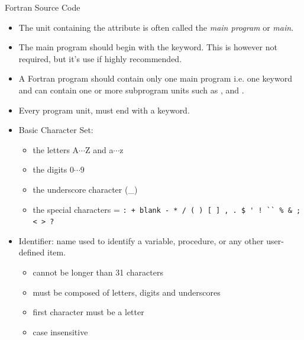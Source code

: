 \documentclass[10pt,t]{beamer}
\begin{document}
\begin{frame}{Fortran Source Code}
\begin{itemize}
      \begin{itemize}
        \item {}
        \item {}
        \item {}
        \item {}
      \end{itemize}
    \item The unit containing the  attribute is often called the {\em main program} or {\em main}.
    \item The main program should begin with the  keyword. This is however not required, but it's use if highly recommended.
    \item A Fortran program should contain only one main program i.e. one  keyword and can contain one or more subprogram units such as ,  and .
    \item Every program unit, must end with a  keyword.
  \end{itemize}
\end{frame}

\begin{frame}[fragile]{}
  \begin{itemize}
  \item Basic Character Set:
    \begin{itemize}
    \item the letters A$\cdots$Z and a$\cdots$z
    \item the digits 0$\cdots$9
    \item the underscore character (\_)
    \item the special characters = \lstinline|: + blank - * / ( ) [ ] , . $ ' ! `` % & ; < > ?|
    \end{itemize}
  \item Identifier: name used to identify a variable, procedure, or any other user-defined item.
    \begin{itemize}
    \item cannot be longer than 31 characters
    \item must be composed of letters, digits and underscores
    \item first character must be a letter
    \item case insensitive
    \end{itemize}
  \end{itemize}
\end{frame}
\end{document}
